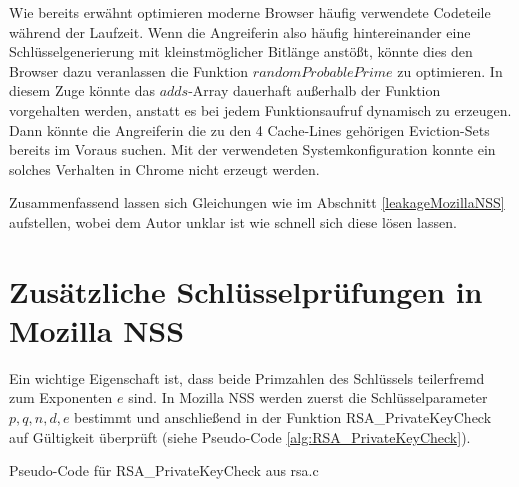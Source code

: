 Wie bereits erwähnt optimieren moderne Browser häufig verwendete Codeteile während der Laufzeit.
Wenn die Angreiferin also häufig hintereinander eine Schlüsselgenerierung mit kleinstmöglicher Bitlänge anstößt, könnte dies den Browser dazu veranlassen die Funktion $randomProbablePrime$ zu optimieren. 
In diesem Zuge könnte das $adds$-Array dauerhaft außerhalb der Funktion vorgehalten werden, anstatt es bei jedem Funktionsaufruf dynamisch zu erzeugen.
Dann könnte die Angreiferin die zu den 4 Cache-Lines gehörigen Eviction-Sets bereits im Voraus suchen.
Mit der verwendeten Systemkonfiguration konnte ein solches Verhalten in Chrome nicht erzeugt werden.

Zusammenfassend lassen sich Gleichungen wie im Abschnitt \ref{leakageMozillaNSS} aufstellen, wobei dem Autor unklar ist wie schnell sich diese lösen lassen.

\section{Zusätzliche Schlüsselprüfungen in Mozilla NSS}
\label{RSAGenGCDAttack}

Ein wichtige Eigenschaft ist, dass beide Primzahlen des Schlüssels teilerfremd zum Exponenten $e$ sind.
In Mozilla NSS werden zuerst die Schlüsselparameter $p,q,n,d,e$ bestimmt und anschließend in der Funktion RSA_PrivateKeyCheck auf Gültigkeit überprüft (siehe Pseudo-Code \ref{alg:RSA_PrivateKeyCheck}).

\begin{algorithm}[h]
\DontPrintSemicolon
\caption{Pseudo-Code für RSA_PrivateKeyCheck aus rsa.c}
\label{alg:RSA_PrivateKeyCheck}

\end{algorithm}


%

